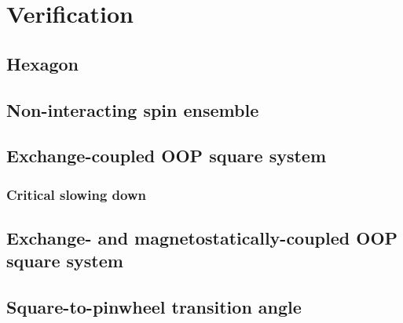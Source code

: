 \section{Verification} %
\subsection{Hexagon}
\subsection{Non-interacting spin ensemble}
\subsection{Exchange-coupled OOP square system}
\subsubsection{Critical slowing down}
\subsection{Exchange- and magnetostatically-coupled OOP square system}
\subsection{Square-to-pinwheel transition angle}
